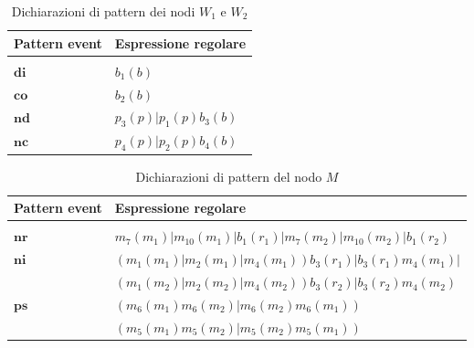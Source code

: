 \begin{table}[htbp] 
\begin{tabularx}{\textwidth}{l X}
\hline
\textbf{Pattern event} & \textbf{Espressione regolare}\\
\hline\\
$\textbf{di}$ & $b_1(b)$\\[1mm]
$\textbf{co}$ & $b_2(b)$\\[1mm]
$\textbf{nd}$ & $p_3(p) | p_1(p)b_3(b)$\\[1mm]
$\textbf{nc}$ & $p_4(p) | p_2(p)b_4(b)$\\[1mm]
\hline
\end{tabularx}
\caption{Dichiarazioni di pattern dei nodi $W_1$ e $W_2$}
\label{tab:pattern_w}
\end{table}

\begin{table}[htbp] 
\begin{tabularx}{\textwidth}{l X}
\hline
\textbf{Pattern event} & \textbf{Espressione regolare}\\
\hline\\
$\textbf{nr}$ & $m_7(m_1) | m_{10}(m_1) | b_1(r_1) | m_7(m_2) | m_{10}(m_2) | b_1(r_2) $\\[1mm]
$\textbf{ni}$ & $(m_1(m_1) | m_2(m_1) | m_4(m_1))b_3(r_1) | b_3(r_1)m_4(m_1) |$\\
			  &	$(m_1(m_2) | m_2(m_2) | m_4(m_2))b_3(r_2) | b_3(r_2)m_4(m_2)$\\[1mm]
$\textbf{ps}$ & $(m_6(m_1)m_6(m_2) | m_6(m_2)m_6(m_1))$\\
			  & $(m_5(m_1)m_5(m_2) | m_5(m_2)m_5(m_1))$\\[1mm]
\hline
\end{tabularx}
\caption{Dichiarazioni di pattern del nodo $M$}
\label{tab:pattern_m}
\end{table}

\newpage
